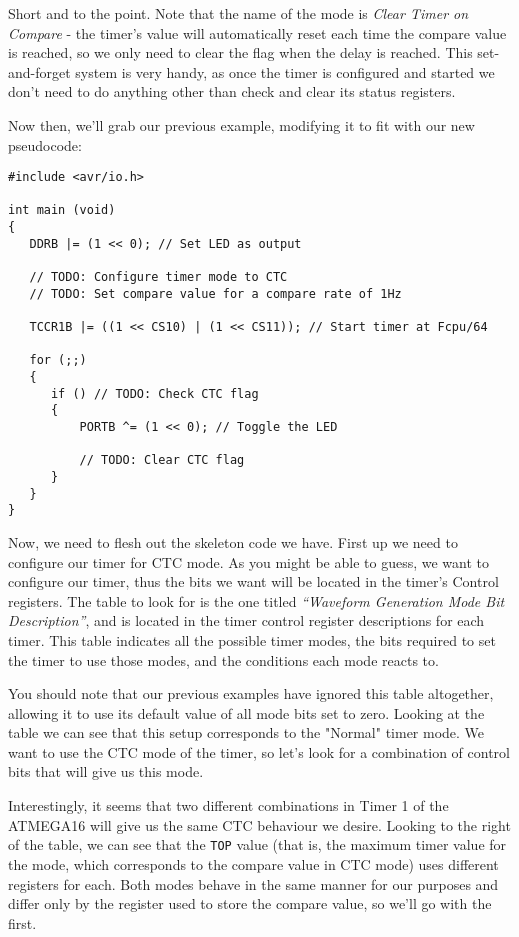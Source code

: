 \documentclass[a4paper,oneside,notitlepage]{book}
\begin{document}
Short and to the point. Note that the name of the mode is \textit{Clear Timer on Compare} - the timer's value will automatically reset each time the compare value is reached, so we only need to clear the flag when the delay is reached. This set-and-forget system is very handy, as once the timer is configured and started we don't need to do anything other than check and clear its status registers.

Now then, we'll grab our previous example, modifying it to fit with our new pseudocode:

\begin{center}
\begin{lstlisting}
#include <avr/io.h>

int main (void)
{
   DDRB |= (1 << 0); // Set LED as output

   // TODO: Configure timer mode to CTC
   // TODO: Set compare value for a compare rate of 1Hz

   TCCR1B |= ((1 << CS10) | (1 << CS11)); // Start timer at Fcpu/64

   for (;;)
   {
      if () // TODO: Check CTC flag
      {
          PORTB ^= (1 << 0); // Toggle the LED

          // TODO: Clear CTC flag
      }
   }
}
\end{lstlisting}
\end{center}

Now, we need to flesh out the skeleton code we have. First up we need to configure our timer for CTC mode. As you might be able to guess, we want to configure our timer, thus the bits we want will be located in the timer's Control registers. The table to look for is the one titled \emph{``Waveform Generation Mode Bit Description''}, and is located in the timer control register descriptions for each timer. This table indicates all the possible timer modes, the bits required to set the timer to use those modes, and the conditions each mode reacts to.

You should note that our previous examples have ignored this table altogether, allowing it to use its default value of all mode bits set to zero. Looking at the table we can see that this setup corresponds to the "Normal" timer mode. We want to use the CTC mode of the timer, so let's look for a combination of control bits that will give us this mode.

Interestingly, it seems that two different combinations in Timer 1 of the ATMEGA16 will give us the same CTC behaviour we desire. Looking to the right of the table, we can see that the \texttt{TOP} value (that is, the maximum timer value for the mode, which corresponds to the compare value in CTC mode) uses different registers for each. Both modes behave in the same manner for our purposes and differ only by the register used to store the compare value, so we'll go with the first.
\end{document}
